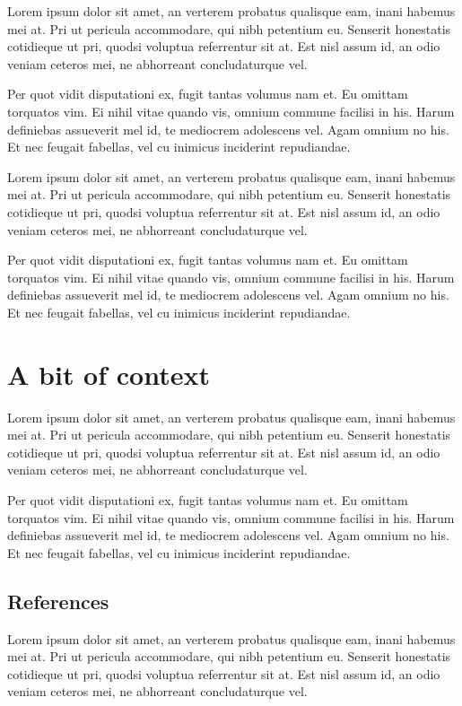 \documentclass[11pt,fleqn]{book} %
\begin{document}
Lorem ipsum dolor sit amet, an verterem probatus qualisque eam, inani habemus mei at. Pri ut pericula accommodare, qui nibh petentium eu. Senserit honestatis cotidieque ut pri, quodsi voluptua referrentur sit at. Est nisl assum id, an odio veniam ceteros mei, ne abhorreant concludaturque vel.

Per quot vidit disputationi ex, fugit tantas volumus nam et. Eu omittam torquatos vim. Ei nihil vitae quando vis, omnium commune facilisi in his. Harum definiebas assueverit mel id, te mediocrem adolescens vel. Agam omnium no his. Et nec feugait fabellas, vel cu inimicus inciderint repudiandae.


Lorem ipsum dolor sit amet, an verterem probatus qualisque eam, inani habemus mei at. Pri ut pericula accommodare, qui nibh petentium eu. Senserit honestatis cotidieque ut pri, quodsi voluptua referrentur sit at. Est nisl assum id, an odio veniam ceteros mei, ne abhorreant concludaturque vel.

Per quot vidit disputationi ex, fugit tantas volumus nam et. Eu omittam torquatos vim. Ei nihil vitae quando vis, omnium commune facilisi in his. Harum definiebas assueverit mel id, te mediocrem adolescens vel. Agam omnium no his. Et nec feugait fabellas, vel cu inimicus inciderint repudiandae.

\section{A bit of context}

Lorem ipsum dolor sit amet, an verterem probatus qualisque eam, inani habemus mei at. Pri ut pericula accommodare, qui nibh petentium eu. Senserit honestatis cotidieque ut pri, quodsi voluptua referrentur sit at. Est nisl assum id, an odio veniam ceteros mei, ne abhorreant concludaturque vel.

Per quot vidit disputationi ex, fugit tantas volumus nam et. Eu omittam torquatos vim. Ei nihil vitae quando vis, omnium commune facilisi in his. Harum definiebas assueverit mel id, te mediocrem adolescens vel. Agam omnium no his. Et nec feugait fabellas, vel cu inimicus inciderint repudiandae.

\subsection{References}

Lorem ipsum dolor sit amet, an verterem probatus qualisque eam, inani habemus mei at. Pri ut pericula accommodare, qui nibh petentium eu. Senserit honestatis cotidieque ut pri, quodsi voluptua referrentur sit at. Est nisl assum id, an odio veniam ceteros mei, ne abhorreant concludaturque vel.
\end{document}
